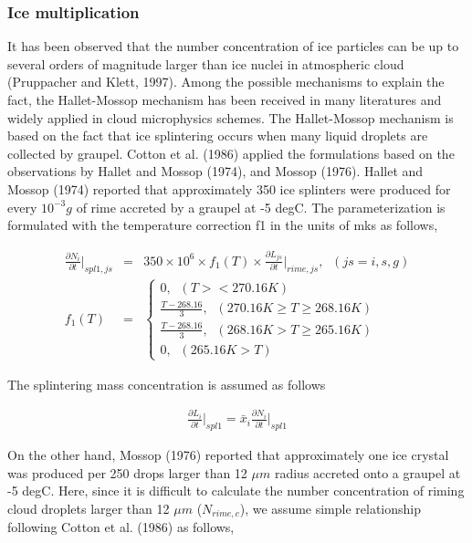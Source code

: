 \subsubsection{Ice multiplication}
It has been observed that the number concentration of ice particles can be up to several orders of magnitude larger than ice nuclei in atmospheric cloud (Pruppacher and Klett, 1997). Among the possible mechanisms to explain the fact, the Hallet-Mossop mechanism has been received in many literatures and widely applied in cloud microphysics schemes. The Hallet-Mossop mechanism is based on the fact that ice splintering occurs when many liquid droplets are collected by graupel. Cotton et al. (1986) applied the formulations based on the observations by Hallet and Mossop (1974), and Mossop (1976). 
Hallet and Mossop (1974) reported that approximately 350 ice splinters were produced for every $10^{-3} g$ of rime accreted by a graupel at -5 degC. The parameterization is formulated with the temperature correction f1 in the units of mks as follows,

\begin{eqnarray}
\frac{\partial N_{i}}{\partial t}\Bigr|_{spl1,js}&=&350\times 10^{6}\times f_{1}(T)\times\frac{\partial L_{js}}{\partial t}\Bigr|_{rime,js},\;\;(js=i,s,g)\label{sn212}\\
f_{1}(T)&=&
\left\{
\begin{array}{l}
0,\;\;(T><270.16K) \\
\frac{T-268.16}{3},\;\;(270.16K \geq T \geq 268.16K) \\
\frac{T-268.16}{3},\;\;(268.16K > T \geq 265.16K) \\
0,\;\;(265.16K>T)
\label{sn213}
\end{array}
\right.
\end{eqnarray}

The splintering mass concentration is assumed as follows

\begin{eqnarray}
\frac{\partial L_{i}}{\partial t}\Bigr|_{spl1}=\bar{x}_{i}\frac{\partial N_{i}}{\partial t}\Bigr|_{spl1}\label{sn214}
\end{eqnarray}

On the other hand, Mossop (1976) reported that approximately one ice crystal was produced per 250 drops larger than 12 $\mu m$ radius accreted onto a graupel at -5 degC. Here, since it is difficult to calculate the number concentration of riming cloud droplets larger than 12 $\mu m$ ($N_{rime,c}$), we assume simple relationship following Cotton et al. (1986) as follows,


